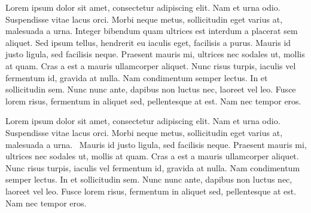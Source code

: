 \documentclass{article}
\begin{document}
Lorem ipsum dolor sit amet, consectetur adipiscing elit. Nam et urna odio. 
Suspendisse vitae lacus orci. Morbi neque metus, sollicitudin eget varius 
at, malesuada a urna. Integer bibendum quam ultrices est interdum a 
placerat sem aliquet. Sed ipsum tellus, hendrerit eu iaculis eget, 
facilisis a purus. Mauris id justo ligula, sed facilisis neque. Praesent 
mauris mi, ultrices nec sodales ut, mollis at quam. Cras a est a mauris 
ullamcorper aliquet. Nunc risus turpis, iaculis vel fermentum id, gravida 
at nulla. Nam condimentum semper lectus. In et sollicitudin sem. Nunc nunc 
ante, dapibus non luctus nec, laoreet vel leo. Fusce lorem risus, 
fermentum in aliquet sed, pellentesque at est. Nam nec tempor eros.

Lorem ipsum dolor sit amet, consectetur adipiscing elit. Nam et urna odio. 
Suspendisse vitae lacus orci. Morbi neque metus, sollicitudin eget varius 
at, malesuada a urna. \cbend\ Mauris id justo ligula, sed facilisis neque. 
Praesent mauris mi, ultrices nec sodales ut, mollis at quam. Cras a est a 
mauris ullamcorper aliquet. Nunc risus turpis, iaculis vel fermentum id, 
gravida at nulla. Nam condimentum semper lectus. In et sollicitudin sem. 
Nunc nunc ante, dapibus non luctus nec, laoreet vel leo. Fusce lorem risus, 
fermentum in aliquet sed, pellentesque at est. Nam nec tempor eros.
\end{document}
